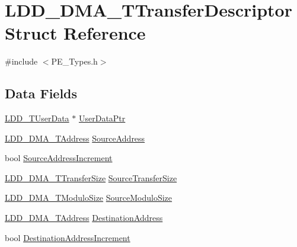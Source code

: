\hypertarget{struct_l_d_d___d_m_a___t_transfer_descriptor}{}\section{L\+D\+D\+\_\+\+D\+M\+A\+\_\+\+T\+Transfer\+Descriptor Struct Reference}
\label{struct_l_d_d___d_m_a___t_transfer_descriptor}


{\ttfamily \#include $<$P\+E\+\_\+\+Types.\+h$>$}

\subsection*{Data Fields}
\begin{DoxyCompactItemize}
\item 
\hyperlink{group___p_e___types__module_ga0b66a73f87238a782318aa0be7578e35}{L\+D\+D\+\_\+\+T\+User\+Data} $\ast$ \hyperlink{struct_l_d_d___d_m_a___t_transfer_descriptor_a4136d6742944c7b04a94695c78b581b8}{User\+Data\+Ptr}
\item 
\hyperlink{group___p_e___types__module_gab8287f62db7ff96992355760b652cd07}{L\+D\+D\+\_\+\+D\+M\+A\+\_\+\+T\+Address} \hyperlink{struct_l_d_d___d_m_a___t_transfer_descriptor_a1f204488d1a8b0c542fb7523f604b5e3}{Source\+Address}
\item 
bool \hyperlink{struct_l_d_d___d_m_a___t_transfer_descriptor_afd5e0566912bf5b706cd350519ad77c6}{Source\+Address\+Increment}
\item 
\hyperlink{group___p_e___types__module_ga868f08f9448e5df27a38314f0893d84a}{L\+D\+D\+\_\+\+D\+M\+A\+\_\+\+T\+Transfer\+Size} \hyperlink{struct_l_d_d___d_m_a___t_transfer_descriptor_a96068433ffe065c3fa85f7d2f9a9b545}{Source\+Transfer\+Size}
\item 
\hyperlink{group___p_e___types__module_gacf2f2d4310e7634351c68e1f64a4c483}{L\+D\+D\+\_\+\+D\+M\+A\+\_\+\+T\+Modulo\+Size} \hyperlink{struct_l_d_d___d_m_a___t_transfer_descriptor_a65316d477535d064953174d3eb7eadfe}{Source\+Modulo\+Size}
\item 
\hyperlink{group___p_e___types__module_gab8287f62db7ff96992355760b652cd07}{L\+D\+D\+\_\+\+D\+M\+A\+\_\+\+T\+Address} \hyperlink{struct_l_d_d___d_m_a___t_transfer_descriptor_a36982f9f85fdeab04f7942d173f9bcb7}{Destination\+Address}
\item 
bool \hyperlink{struct_l_d_d___d_m_a___t_transfer_descriptor_a4f0e7ef5b8fc25661c26ded1e89a1c95}{Destination\+Address\+Increment}
\item 

\end{DoxyCompactItemize}
